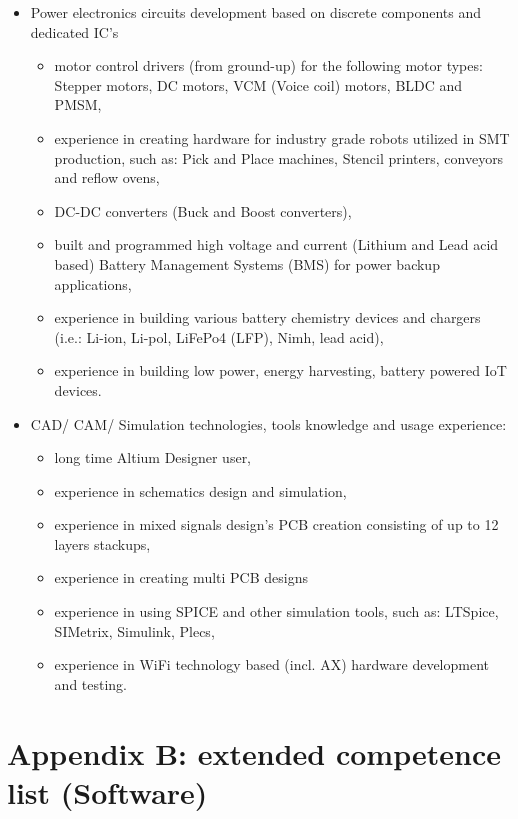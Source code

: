 \documentclass{tccv}
\begin{document}
\begin{itemize}
	\item Power electronics circuits development based on discrete components and dedicated IC's
	\begin{itemize}
		\item motor control drivers (from ground-up) for the following motor types: Stepper motors, DC motors, VCM (Voice coil) motors, BLDC and PMSM,
		\item experience in creating hardware for industry grade robots utilized in SMT production, such as: Pick and Place machines, Stencil printers, conveyors and reflow ovens,
	\item DC-DC converters (Buck and Boost converters),
	\item built and programmed high voltage and current (Lithium and Lead acid based) Battery Management Systems (BMS) for power backup applications,
	\item experience in building various battery chemistry devices and chargers (i.e.: Li-ion, Li-pol, LiFePo4 (LFP), Nimh, lead acid), 
	\item experience in building low power, energy harvesting, battery powered IoT devices.
	\end{itemize}
\end{itemize}

\begin{itemize}
	\item CAD/ CAM/ Simulation technologies, tools knowledge and usage experience:
	\begin{itemize}
		\item long time Altium Designer user,
		\item experience in schematics design and simulation,
		\item experience in mixed signals design's PCB creation consisting of up to 12 layers stackups,
		\item experience in creating multi PCB designs
		\item experience in using SPICE and other simulation tools, such as: LTSpice, SIMetrix, Simulink, Plecs,
		\item experience in WiFi technology based (incl. AX) hardware development and testing.
		
	\end{itemize}
\end{itemize}
     
\clearpage

\section{Appendix B: extended competence list (Software)}
\end{document}
